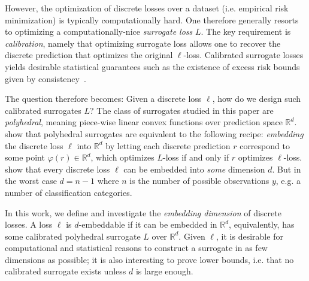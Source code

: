 \documentclass[anon]{colt2020} %
\newcommand{\reals}{\mathbb{R}}
\begin{document}
However, the optimization of discrete losses over a dataset (i.e. empirical risk minimization) is typically computationally hard.
One therefore generally resorts to optimizing a computationally-nice \emph{surrogate loss} $L$.
The key requirement is \emph{calibration}, namely that optimizing surrogate loss allows one to recover the discrete prediction that optimizes the original $\ell$-loss.
Calibrated surrogate losses yields desirable statistical guarantees such as the existence of excess risk bounds given by consistency~\citep{tewari2007consistency}.

The question therefore becomes: Given a discrete loss $\ell$, how do we design such calibrated surrogates $L$? 
The class of surrogates studied in this paper are \emph{polyhedral}, meaning piece-wise linear convex functions over prediction space $\reals^d$.
\cite{finocchiaro2019embedding} show that polyhedral surrogates are equivalent to the following recipe: \emph{embedding} the discrete loss $\ell$ into $\reals^d$ by letting each discrete prediction $r$ correspond to some point $\varphi(r) \in \reals^d$, which optimizes $L$-loss if and only if $r$ optimizes $\ell$-loss.
\cite{finocchiaro2019embedding} show that every discrete loss $\ell$ can be embedded into \emph{some} dimension $d$.
But in the worst case $d=n-1$ where $n$ is the number of possible observations $y$, e.g. a number of classification categories.

In this work, we define and investigate the \emph{embedding dimension} of discrete losses.
A loss $\ell$ is $d$-embeddable if it can be embedded in $\reals^d$, equivalently, has some calibrated polyhedral surrogate $L$ over $\reals^d$.
Given $\ell$, it is desirable for computational and statistical reasons to construct a surrogate in as few dimensions as possible; it is also interesting to prove lower bounds, i.e. that no calibrated surrogate exists unless $d$ is large enough.
\end{document}
